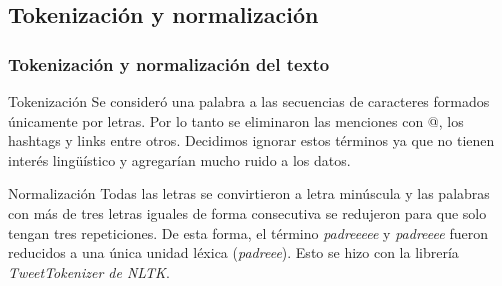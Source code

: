 
\subsection{Tokenización y normalización}

\begin{frame}[t]\frametitle{Tokenización y normalización del texto}
    \begin{block}{Tokenización}
    Se consideró una palabra a las secuencias de caracteres formados únicamente por letras. Por lo tanto se eliminaron las menciones con @, los hashtags y links entre otros. Decidimos ignorar estos términos ya que no tienen interés lingüístico y agregarían mucho ruido a los datos.
    \end{block}

    \begin{block}{Normalización}
    Todas las letras se convirtieron a letra minúscula y las palabras con más de tres letras iguales de forma consecutiva se redujeron para que solo tengan tres repeticiones. De esta forma, el término \textit{padreeeee} y \textit{padreeee} fueron reducidos a una única unidad léxica (\textit{padreee}). Esto se hizo con la librería \textit{TweetTokenizer de NLTK}. 
    \end{block}

\end{frame}
